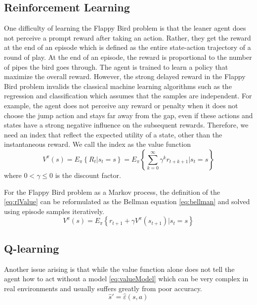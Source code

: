 \documentclass[conference,compsoc]{IEEEtran}
\begin{document}
\subsection{Reinforcement Learning}
One difficulty of learning the Flappy Bird problem is that the leaner agent does not perceive a prompt reward after taking an action. Rather, they get the reward at the end of an episode which is defined as the entire state-action trajectory of a round of play. At the end of an episode, the reward is proportional to the number of pipes the bird goes through. The agent is trained to learn a policy that maximize the overall reward. 
However, the strong delayed reward in the Flappy Bird problem invalids the classical machine learning algorithms such as the regression and classification which assumes that the samples are independent. For example, the agent does not perceive any reward or penalty when it does not choose the jump action and stays far away from the gap, even if these actions and states have a strong negative influence on the subsequent rewards. Therefore, we need an index that reflect the expected utility of a state, other than the instantaneous reward. We call the index as the value function
\begin{equation}\label{eq:rlValue}
V^{\pi}(s)
= E_{\pi} \left\{ R_t | s_t =s \right\}
= E_{\pi} \left\{ \sum_{k=0}^{\infty} \gamma^k r_{t+k+1} | s_t =s \right\}
\end{equation}
where $0<\gamma\leq 0$ is the discount factor. 
 
For the Flappy Bird problem as a Markov process, the definition of the \eqref{eq:rlValue} can be reformulated as the Bellman equation \eqref{eq:bellman} and solved using episode samples iteratively. 
\begin{equation}\label{eq:bellman}
V^{\pi}(s)
= E_{\pi} \left\{ r_{t+1}+\gamma V^{\pi}(s_{t+1}) | s_t =s \right\}
\end{equation}

\subsection{Q-learning}
Another issue arising is that while the value function alone does not tell the agent how to act without a model \eqref{eq:valueModel} which can be very complex in real environments and usually suffers greatly from poor accuracy. ~\cite{strehl2006pac}
\begin{equation}\label{eq:valueModel}
\hat{s}' = \hat{\varepsilon} (s,a)
\end{equation}
\end{document}
